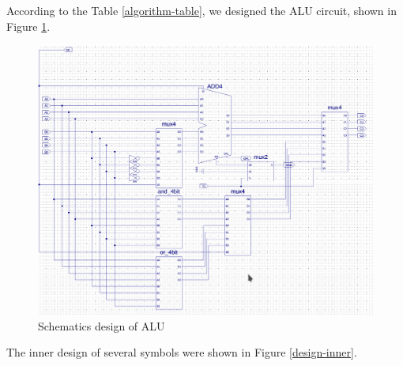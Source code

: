 \documentclass{article}
\begin{document}
According to the Table \ref{algorithm-table}, we designed the ALU circuit, shown in Figure \ref{design-alu}. \\

\begin{figure}[!htbp]
\centering
\includegraphics[width=0.8\linewidth]{alu.png}
\caption{Schematics design of ALU}
\label{design-alu}
\end{figure}

The inner design of several symbols were shown in Figure \ref{design-inner}. \\
\end{document}
